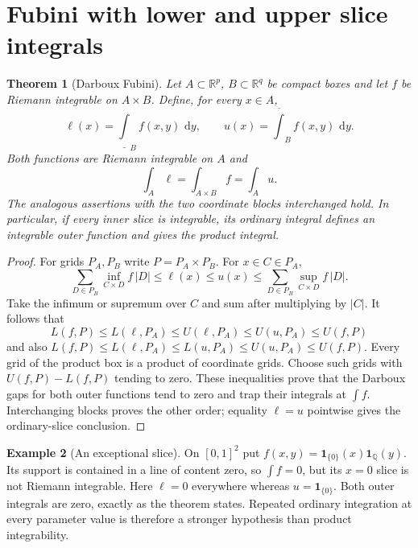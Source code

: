 \documentclass[11pt,oneside,openany]{book}
\newtheorem{theorem}{Theorem}[chapter]
\theoremstyle{definition}
\newtheorem{example}[theorem]{Example}
\theoremstyle{remark}
\newcommand{\Q}{\mathbb Q}
\newcommand{\R}{\mathbb R}
\newcommand{\dd}{\,\mathrm d}
\newcommand{\family}[1]{}
\begin{document}
\section{Fubini with lower and upper slice integrals}
\family{K04.06.09}\family{K04.06.10}
\begin{theorem}[Darboux Fubini]\label{d04:06:fubini}
Let $A\subset\R^p$, $B\subset\R^q$ be compact boxes and let $f$ be Riemann integrable on $A\times B$. Define, for every $x\in A$,
\[
 \ell(x)=\underline{\int}_B f(x,y)\,\dd y,
 \qquad u(x)=\overline{\int}_B f(x,y)\,\dd y.
\]
Both functions are Riemann integrable on $A$ and
\[
 \int_A\ell=\int_{A\times B}f=\int_Au.
\]
The analogous assertions with the two coordinate blocks interchanged hold. In particular, if every inner slice is integrable, its ordinary integral defines an integrable outer function and gives the product integral.
\end{theorem}
\begin{proof}
For grids $P_A,P_B$ write $P=P_A\times P_B$. For $x\in C\in P_A$,
\[
 \sum_{D\in P_B}\inf_{C\times D}f\,|D|
 \leq \ell(x)\leq u(x)\leq
 \sum_{D\in P_B}\sup_{C\times D}f\,|D|.
\]
Take the infimum or supremum over $C$ and sum after multiplying by $|C|$. It follows that
\[
 L(f,P)\leq L(\ell,P_A)\leq U(\ell,P_A)\leq U(u,P_A)\leq U(f,P)
\]
and also
$L(f,P)\leq L(\ell,P_A)\leq L(u,P_A)\leq U(u,P_A)\leq U(f,P)$.
Every grid of the product box is a product of coordinate grids. Choose such grids with $U(f,P)-L(f,P)$ tending to zero. These inequalities prove that the Darboux gaps for both outer functions tend to zero and trap their integrals at $\int f$. Interchanging blocks proves the other order; equality $\ell=u$ pointwise gives the ordinary-slice conclusion.
\end{proof}

\begin{example}[An exceptional slice]\label{d04:06:bad-slice}
On $[0,1]^2$ put $f(x,y)=\mathbf1_{\{0\}}(x)\mathbf1_{\Q}(y)$. Its support is contained in a line of content zero, so $\int f=0$, but its $x=0$ slice is not Riemann integrable. Here $\ell=0$ everywhere whereas $u=\mathbf1_{\{0\}}$. Both outer integrals are zero, exactly as the theorem states. Repeated ordinary integration at every parameter value is therefore a stronger hypothesis than product integrability.
\end{example}
\end{document}
